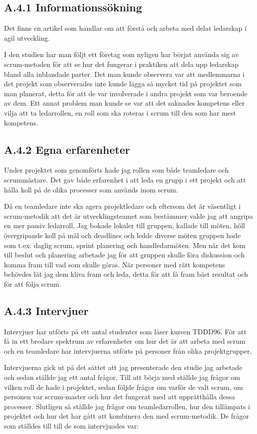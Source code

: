 \subsection{A.4.1 Informationssökning}
Det finns en artikel som handlar om att förstå och arbeta med delat ledarskap i agil utveckling.

I den studien har man följt ett företag som nyligen har börjat använda sig av scrum-metoden för att se hur det fungerar i praktiken att dela upp ledarskap bland alla inblandade parter. Det man kunde observera var att medlemmarna i det projekt som observerades inte kunde lägga så mycket tid på projektet som man planerat, detta för att de var involverade i andra projekt som var beroende av dem. Ett annat problem man kunde se var att det saknades kompetens eller vilja att ta ledarrollen, en roll som ska roteras i scrum till den som har mest kompetens. \cite{sharedleader}

\subsection{A.4.2 Egna erfarenheter}
Under projektet som genomförts hade jag rollen som både teamledare och scrummästare. Det gav både erfarenhet i att leda en grupp i ett projekt och att hålla koll på de olika processer som används inom scrum.

Då en teamledare inte ska agera projektledare och eftersom det är väsentligt i scrum-metodik att det är utvecklingsteamet som bestämmer valde jag att angripa en mer passiv ledarroll. Jag bokade lokaler till gruppen, kallade till möten, höll övergripande koll på mål och deadlines och ledde diverse möten gruppen hade som t.ex. daglig scrum, sprint planering och handledarmöten. Men när det kom till beslut och planering arbetade jag för att gruppen skulle föra diskussion och komma fram till vad som skulle göras. När personer med rätt kompetens behövdes lät jag dem kliva fram och leda, detta för att få fram bäst resultat och för att följa scrum.

\subsection{A.4.3 Intervjuer}
Intervjuer har utförts på ett antal studenter som läser kursen TDDD96. För att få in ett bredare spektrum av erfarenheter om hur det är att arbeta med scrum och en teamledare har intervjuerna utförts på personer från olika projektgrupper.

Intervjuerna gick ut på det sättet att jag presenterade den studie jag arbetade och sedan ställde jag ett antal frågor. Till att börja med ställde jag frågor om vilken roll de hade i projektet, sedan följde frågor om varför de valt scrum, om personen var scrum-master och hur det fungerat med att upprätthålla dessa processer. Slutligen så ställde jag frågor om teamledarrollen, hur den tillämpats i projektet och hur det har gått att kombinera den med scrum-metodik. De frågor som ställdes till till de som intervjuades var:

